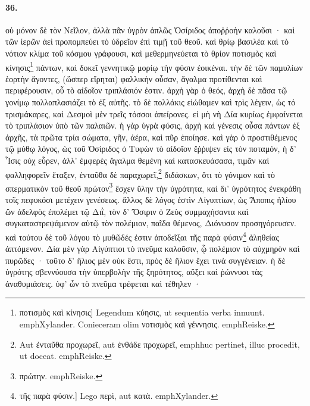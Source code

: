 \documentclass[a4paper, 11pt, oneside, polutonikogreek, german]{article}
\begin{document}
\paragraph{36.}
οὐ μόνον δὲ τὸν Νεῖλον, ἀλλὰ πᾶν ὑγρὸν ἁπλῶς Ὀσίριδος ἀποῤῥοὴν καλοῦσι · καὶ τῶν ἱερῶν ἀεὶ προπομπεύει τὸ ὑδρεῖον ἐπὶ τιμῇ τοῦ θεοῦ. καὶ θρίῳ βασιλέα καὶ τὸ νότιον κλίμα τοῦ κόσμου γράφουσι, καὶ μεθερμηνεύεται τὸ θρίον ποτισμὸς καὶ κίνησις\footnote{ποτισμὸς καὶ κίνησις] Legendum κύησις, ut sequentia verba innuunt. emph{Xylander.} Conieceram olim νοτισμὸς καὶ γέννησις. emph{Reiske.}} πάντων, καὶ δοκεῖ γεννητικῷ μορίῳ τὴν φύσιν ἐοικέναι. τὴν δὲ τῶν παμυλίων ἑορτὴν ἄγοντες, (ὥσπερ εἴρηται) φαλλικὴν οὖσαν, ἄγαλμα προτίθενται καὶ περιφέρουσιν, οὗ τὸ αἰδοῖον τριπλάσιόν ἐστιν. ἀρχὴ γὰρ ὁ θεός, ἀρχὴ δὲ πᾶσα τῷ γονίμῳ πολλαπλασιάζει τὸ ἐξ αὐτῆς. τὸ δὲ πολλάκις εἰώθαμεν καὶ τρὶς λέγειν, ὡς τό τρισμάκαρες, καὶ Δεσμοὶ μὲν τρεῖς τόσσοι ἀπείρονες. εἰ μὴ νὴ Δία κυρίως ἐμφαίνεται τὸ τριπλάσιον ὑπὸ τῶν παλαιῶν. ἡ γὰρ ὑγρὰ φύσις, ἀρχὴ καὶ γένεσις οὖσα πάντων ἐξ ἀρχῆς, τὰ πρῶτα τρία σώματα, γῆν, ἀέρα, καὶ πῦρ ἐποίησε. καὶ γὰρ ὁ προστιθέμενος τῷ μύθῳ λόγος, ὡς τοῦ Ὀσίριδος ὁ Τυφὼν τὸ αἰδοῖον ἔῤῥιψεν εἰς τὸν ποταμόν, ἡ δ' Ἶσις οὐχ εὗρεν, ἀλλ' ἐμφερὲς ἄγαλμα θεμένη καὶ κατασκευάσασα, τιμᾶν καὶ φαλληφορεῖν ἔταξεν, ἐνταῦθα δὲ παραχωρεῖ,\footnote{Aut ἐνταῦθα προχωρεῖ, aut ἐνθάδε προχωρεῖ, emph{huc pertinet, illuc procedit, ut doceat.} emph{Reiske.}} διδάσκων, ὅτι τὸ γόνιμον καὶ τὸ σπερματικὸν τοῦ θεοῦ πρώτον\footnote{πρώτην. emph{Reiske.}} ἔσχεν ὕλην τὴν ὑγρότητα, καὶ δι' ὑγρότητος ἐνεκράθη τοῖς πεφυκόσι μετέχειν γενέσεως. ἄλλος δὲ λόγος ἐστὶν Αἰγυπτίων, ὡς Ἄποπις ἡλίου ὢν ἀδελφὸς ἐπολέμει τῷ Διῒ, τὸν δ' Ὄσιριν ὁ Ζεὺς συμμαχήσαντα καὶ συγκαταστρεψάμενον αὐτῷ τὸν πολέμιον, παῖδα θέμενος, Διόνυσον προσηγόρευσεν. καὶ τούτου δὲ τοῦ λόγου τὸ μυθῶδές ἐστιν ἀποδεῖξαι τῆς παρὰ φύσιν\footnote{τῆς παρὰ φύσιν.] Lego περὶ, aut κατὰ. emph{Xylander.}} ἀληθείας ἁπτόμενον. Δία μὲν γὰρ Αἰγύπτιοι τὸ πνεῦμα καλοῦσιν, ᾧ πολέμιον τὸ αὐχμηρὸν καὶ πυρῶδες · τοῦτο δ' ἥλιος μὲν οὐκ ἔστι, πρὸς δὲ ἥλιον ἔχει τινὰ συγγένειαν. ἡ δὲ ὑγρότης σβεννύουσα τὴν ὑπερβολὴν τῆς ξηρότητος, αὔξει καὶ ῥώννυσι τὰς ἀναθυμιάσεις. ὑφ' ὧν τὸ πνεῦμα τρέφεται καὶ τέθηλεν ·
\end{document}
